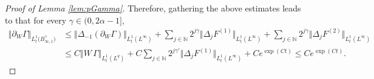 \documentclass[reqno,11pt,a4paper]{amsart}
\newcommand{\dd}{\mathrm{d}}
\begin{document}
\begin{proof}[Proof of Lemma \ref{lem:pGamma}]

Therefore, gathering the above estimates leads to that for every $\gamma\in (0,2\alpha-1]$,
\begin{align}\label{eq:parW-Gam-L1Bes1}
  \left\Vert \partial_W \Gamma\right\Vert _{L_t^1\big(B_{\infty, 1}^{\gamma}\big)}  
  &\leq \Vert \Delta_{-1} (\partial_W \Gamma)\Vert _{L_t^1(L^\infty)} + \sum_{j\in\mathbb{N}} 2^{j\gamma} 
  \Vert \Delta_j F^{(1)}\Vert _{L^1_t(L^\infty)}
  +\sum_{j\in\mathbb{N}} 2^{j\gamma} \Vert \Delta_j F^{(2)}\Vert _{L^1_t(L^\infty)} \nonumber \\
  &\leq C \Vert W\, \Gamma\Vert _{L_t^1(L^q)} 
  + C \sum_{j\in\mathbb{N}} 2^{j\gamma'} \Vert \Delta_j F^{(1)}\Vert _{L^1_t(L^\infty)}
  + C e^{\exp(Ct)}  \leq C e^{\exp(Ct)}.
\end{align}


\end{proof}
\end{document}
